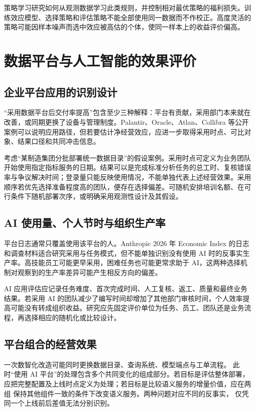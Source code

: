 策略学习研究如何从观测数据学习此类规则，并控制相对最优策略的福利损失\cite{policy08}。训练效应模型、选择策略和评估策略不能全部使用同一数据而不作校正。高度灵活的策略可能因样本噪声而选中效应被高估的个体，使同一样本上的收益评价偏高。

\section{数据平台与人工智能的效果评价}

\subsection{企业平台应用的识别设计}
“采用数据平台后交付率提高”包含至少三种解释：平台有贡献，采用部门本来就在改善，或同期更换了设备与管理制度。Palantir、Oracle、Atlan、Collibra 等公开案例可以说明应用路径，但若要估计净经营效应，应进一步取得采用时点、可比对象、结果口径和共同冲击信息。

考虑“某制造集团分批部署统一数据目录”的假设案例。采用时点可定义为业务团队开始使用指定指标服务的日期。结果可以是完成标准分析任务的总工时、复核错误率与争议解决时间；登录量只能反映使用情况，不能单独代表上述经营效果。采用顺序若优先选择准备程度高的团队，便存在选择偏差。可随机安排培训名额、在可行条件下随机部署次序，或明确采用观测性设计及其假设。

\subsection{AI 使用量、个人节时与组织生产率}
平台日志通常只覆盖使用该平台的人。Anthropic 2026 年 Economic Index 的日志和调查材料适合研究采用与任务模式，但不能单独识别没有使用 AI 时的反事实生产率\cite{aiindex08}。高技能员工可能更早采用，困难任务也可能更常求助于 AI，这两种选择机制对观察到的生产率差异可能产生相反方向的偏差。

AI 应用评估应记录任务难度、首次完成时间、人工复核、返工、质量和最终业务结果。若采用 AI 的团队减少了编写时间却增加了其他部门审核时间，个人效率提高可能没有转成组织收益。研究应先固定评价单位为任务、员工、团队还是业务流程，再选择相应的随机化或比较设计。

\subsection{平台组合的经营效果}
一次数智化改造可能同时更换数据目录、查询系统、模型端点与工单流程。
此时“使用 AI 平台”的处理包含多个共同变化的组成部分。若目标是评估整体部署，
应把完整配置及上线时点定义为处理；若目标是比较语义服务的增量价值，应在两组
保持其他组件一致的条件下改变语义服务。两种问题对应不同的反事实，
仅凭同一个上线前后差值无法分别识别。

